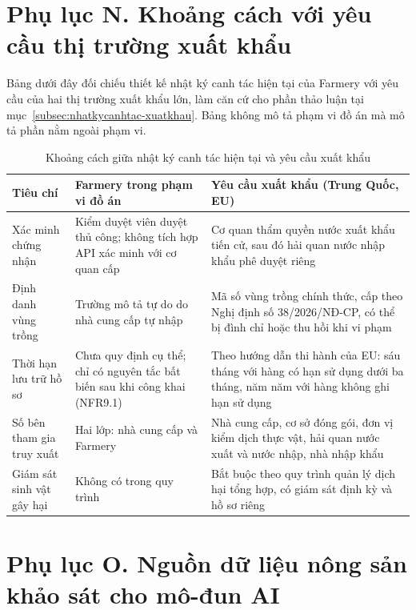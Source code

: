 \section*{Phụ lục N. Khoảng cách với yêu cầu thị trường xuất khẩu}
\label{apdx:xuatkhau}

Bảng dưới đây đối chiếu thiết kế nhật ký canh tác hiện tại của Farmery với yêu cầu của hai thị trường xuất khẩu lớn, làm căn cứ cho phần thảo luận tại mục~\ref{subsec:nhatkycanhtac-xuatkhau}. Bảng không mô tả phạm vi đồ án mà mô tả phần nằm ngoài phạm vi.

\begingroup
\tblsetup\tblzebra
\begin{table}[H]
\centering
\small
\caption{Khoảng cách giữa nhật ký canh tác hiện tại và yêu cầu xuất khẩu}
\label{tab:khoangcachxuatkhau}
\begin{tabular}{L{3.24cm} L{5.83cm} L{5.83cm}}
\toprule
{}
\textbf{Tiêu chí} & \textbf{Farmery trong phạm vi đồ án} & \textbf{Yêu cầu xuất khẩu (Trung Quốc, EU)} \\
\midrule
Xác minh chứng nhận & Kiểm duyệt viên duyệt thủ công; không tích hợp API xác minh với cơ quan cấp & Cơ quan thẩm quyền nước xuất khẩu tiến cử, sau đó hải quan nước nhập khẩu phê duyệt riêng \\
Định danh vùng trồng & Trường mô tả tự do do nhà cung cấp tự nhập & Mã số vùng trồng chính thức, cấp theo Nghị định số 38/2026/NĐ-CP, có thể bị đình chỉ hoặc thu hồi khi vi phạm \\
Thời hạn lưu trữ hồ sơ & Chưa quy định cụ thể; chỉ có nguyên tắc bất biến sau khi công khai (NFR9.1) & Theo hướng dẫn thi hành của EU: sáu tháng với hàng có hạn sử dụng dưới ba tháng, năm năm với hàng không ghi hạn sử dụng \\
Số bên tham gia truy xuất & Hai lớp: nhà cung cấp và Farmery & Nhà cung cấp, cơ sở đóng gói, đơn vị kiểm dịch thực vật, hải quan nước xuất và nước nhập, nhà nhập khẩu \\
Giám sát sinh vật gây hại & Không có trong quy trình & Bắt buộc theo quy trình quản lý dịch hại tổng hợp, có giám sát định kỳ và hồ sơ riêng \\
\bottomrule
\end{tabular}
\end{table}
\endgroup

\section*{Phụ lục O. Nguồn dữ liệu nông sản khảo sát cho mô-đun AI}
\label{apdx:nguondulieu}

